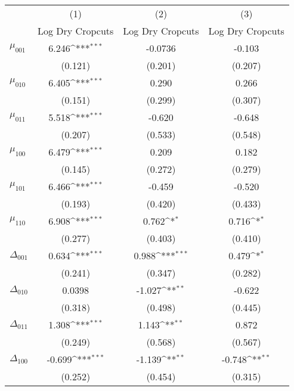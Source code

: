 {
\def\sym#1{\ifmmode^{#1}\else\(^{#1}\)\fi}
\begin{tabular}{l*{3}{c}}
\hline\hline
          &\multicolumn{1}{c}{(1)}&\multicolumn{1}{c}{(2)}&\multicolumn{1}{c}{(3)}\\
          &\multicolumn{1}{c}{Log Dry Cropcuts}&\multicolumn{1}{c}{Log Dry Cropcuts}&\multicolumn{1}{c}{Log Dry Cropcuts}\\
\hline
$\mu_{001}$&    6.246\sym{***}&  -0.0736         &   -0.103         \\
          &  (0.121)         &  (0.201)         &  (0.207)         \\
$\mu_{010}$&    6.405\sym{***}&    0.290         &    0.266         \\
          &  (0.151)         &  (0.299)         &  (0.307)         \\
$\mu_{011}$&    5.518\sym{***}&   -0.620         &   -0.648         \\
          &  (0.207)         &  (0.533)         &  (0.548)         \\
$\mu_{100}$&    6.479\sym{***}&    0.209         &    0.182         \\
          &  (0.145)         &  (0.272)         &  (0.279)         \\
$\mu_{101}$&    6.466\sym{***}&   -0.459         &   -0.520         \\
          &  (0.193)         &  (0.420)         &  (0.433)         \\
$\mu_{110}$&    6.908\sym{***}&    0.762\sym{*}  &    0.716\sym{*}  \\
          &  (0.277)         &  (0.403)         &  (0.410)         \\
$\Delta_{001}$&    0.634\sym{***}&    0.988\sym{***}&    0.479\sym{*}  \\
          &  (0.241)         &  (0.347)         &  (0.282)         \\
$\Delta_{010}$&   0.0398         &   -1.027\sym{**} &   -0.622         \\
          &  (0.318)         &  (0.498)         &  (0.445)         \\
$\Delta_{011}$&    1.308\sym{***}&    1.143\sym{**} &    0.872         \\
          &  (0.249)         &  (0.568)         &  (0.567)         \\
$\Delta_{100}$&   -0.699\sym{***}&   -1.139\sym{**} &   -0.748\sym{**} \\
          &  (0.252)         &  (0.454)         &  (0.315)         \\

\end{tabular}}
